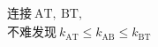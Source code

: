 \documentclass[preview]{standalone}
\begin{document}
\begin{align*}
& \text{连接}\ \mathrm{AT}, \  \mathrm{BT}, \\& \text{不难发现}\ k_{\mathrm{AT}} \leq k_{\mathrm{AB}} \leq k_{\mathrm{BT}}
\end{align*}
\end{document}
